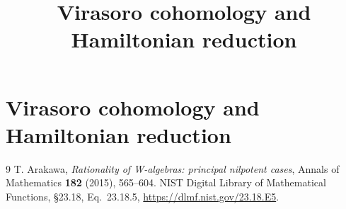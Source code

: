 \documentclass[11pt,oneside]{memoir}
\title{Virasoro cohomology and Hamiltonian reduction}
\author{}
\date{}
\begin{document}
\chapter{Virasoro cohomology and Hamiltonian reduction}






\begin{thebibliography}{9}
 T. Arakawa, \emph{Rationality of W-algebras: principal nilpotent cases}, Annals of Mathematics \textbf{182} (2015), 565--604.
 NIST Digital Library of Mathematical Functions, \S23.18, Eq.~23.18.5, \url{https://dlmf.nist.gov/23.18.E5}.
\end{thebibliography}
\end{document}
